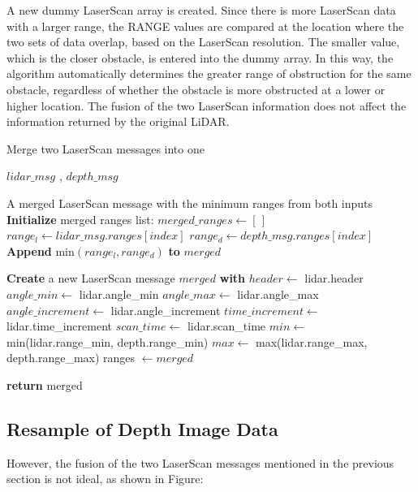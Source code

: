 A new dummy LaserScan array is created. Since there is more LaserScan data with a larger range, the RANGE values are compared at the location where the two sets of data overlap, based on the LaserScan resolution. The smaller value, which is the closer obstacle, is entered into the dummy array. In this way, the algorithm automatically determines the greater range of obstruction for the same obstacle, regardless of whether the obstacle is more obstructed at a lower or higher location. The fusion of the two LaserScan information does not affect the information returned by the original LiDAR.

\begin{algorithm}[H]
    \caption{Merge two LaserScan messages into one}\label{alg:scan_merge}
    \begin{algorithmic}
    \Require $lidar\_msg$ , $depth\_msg$ 
    
    \Ensure A merged LaserScan message with the minimum ranges from both inputs
    \State \textbf{Initialize} merged ranges list: $merged\_ranges \gets [\,]$
        \State $range_l \gets lidar\_msg.ranges[index]$
        \State $range_d \gets depth\_msg.ranges[index]$
        \State \textbf{Append} $\text{min}(range_l, range_d)$ \textbf{to} $merged$
    \EndFor

    \State \textbf{Create} a new LaserScan message $merged$ \textbf{with}
        \State $header \gets$ lidar.header
        \State $angle\_min \gets$ lidar.angle\_min
        \State $angle\_max \gets$ lidar.angle\_max
        \State $angle\_increment \gets$ lidar.angle\_increment
        \State $time\_increment \gets$ lidar.time\_increment
        \State $scan\_time \gets$ lidar.scan\_time
        \State $min \gets$ min(lidar.range\_min, depth.range\_min)
        \State $max \gets$ max(lidar.range\_max, depth.range\_max)
        \State ranges $\gets merged$

    \State \textbf{return} merged
    \end{algorithmic}
\end{algorithm}

\subsection{Resample of Depth Image Data}
However, the fusion of the two LaserScan messages mentioned in the previous section is not ideal, as shown in Figure:

